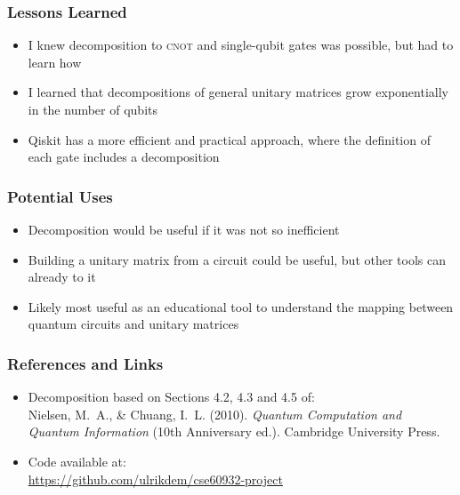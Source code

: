 \documentclass{beamer}
\begin{document}
\begin{frame}
    \frametitle{Lessons Learned}
    \begin{itemize}
        \item I knew decomposition to \textsc{cnot} and single-qubit gates was possible, but had to learn how
        \item I learned that decompositions of general unitary matrices grow exponentially in the number of qubits
        \item Qiskit has a more efficient and practical approach, where the definition of each gate includes a decomposition
    \end{itemize}
\end{frame}

\begin{frame}
    \frametitle{Potential Uses}
    \begin{itemize}
        \item Decomposition would be useful if it was not so inefficient
        \item Building a unitary matrix from a circuit could be useful, but other tools can already to it
        \item Likely most useful as an educational tool to understand the mapping between quantum circuits and unitary matrices
    \end{itemize}
\end{frame}

\begin{frame}
    \frametitle{References and Links}
    \begin{itemize}
        \item Decomposition based on Sections 4.2, 4.3 and 4.5 of: \\
            Nielsen, M.\ A., \& Chuang, I.\ L. (2010). \emph{Quantum Computation and Quantum Information} (10th Anniversary ed.). Cambridge University Press.
        \item Code available at: \\
            \url{https://github.com/ulrikdem/cse60932-project}
    \end{itemize}
\end{frame}
\end{document}
